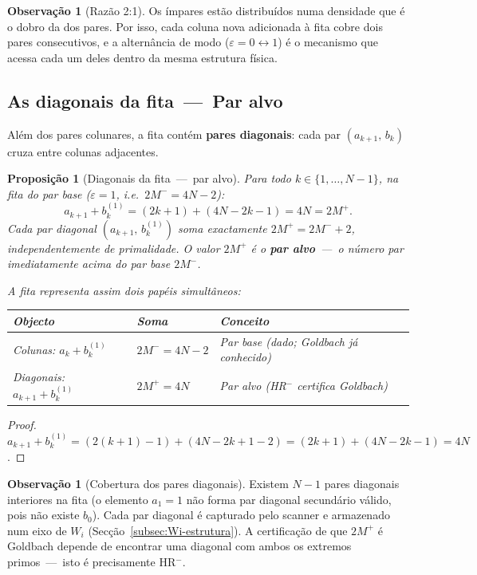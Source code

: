 \documentclass[12pt, a4paper]{article}
\theoremstyle{plain}
\newtheorem{proposition}[theorem]{Proposição}
\theoremstyle{definition}
\newtheorem{remark}[theorem]{Observação}
\theoremstyle{remark}
\begin{document}
	\begin{remark}[Razão 2:1]
		Os ímpares estão distribuídos numa densidade que é o dobro da dos
		pares.  Por isso, cada coluna nova adicionada à fita cobre dois
		pares consecutivos, e a alternância de modo
		($\varepsilon=0\leftrightarrow1$) é o mecanismo que acessa cada
		um deles dentro da mesma estrutura física.
	\end{remark}
	
	\subsection{As diagonais da fita~---~Par alvo}
	\label{subsec:diagonais}
	
	Além dos pares colunares, a fita contém \textbf{pares diagonais}: cada
	par $(a_{k+1},\,b_k)$ cruza entre colunas adjacentes.
	
	\begin{proposition}[Diagonais da fita~---~par alvo]
		\label{prop:diagonal-alvo}
		Para todo $k\in\{1,\ldots,N-1\}$, na fita do par base
		($\varepsilon=1$, i.e.\ $2M^-=4N-2$):
		\[
		a_{k+1}+b_k^{(1)}
		=(2k+1)+(4N-2k-1)
		=4N=2M^+.
		\]
		Cada par diagonal $(a_{k+1},\,b_k^{(1)})$ soma exactamente
		$2M^+=2M^-+2$, independentemente de primalidade.
		O valor $2M^+$ é o \textbf{par alvo}~---~o número par
		imediatamente acima do par base $2M^-$.
		
		\medskip
		A fita representa assim dois papéis simultâneos:
		\begin{center}
			\begin{tabular}{lll}
				\toprule
				Objecto & Soma & Conceito\\
				\midrule
				Colunas: $a_k+b_k^{(1)}$ &
				$2M^-=4N-2$ & Par base (dado; Goldbach já conhecido)\\
				Diagonais: $a_{k+1}+b_k^{(1)}$ &
				$2M^+=4N$   & Par alvo (HR$^-$ certifica Goldbach)\\
				\bottomrule
			\end{tabular}
		\end{center}
	\end{proposition}
	
	\begin{proof}
		$a_{k+1}+b_k^{(1)}=(2(k+1)-1)+(4N-2k+1-2)=(2k+1)+(4N-2k-1)=4N$.
	\end{proof}
	
	\begin{remark}[Cobertura dos pares diagonais]
		Existem $N-1$ pares diagonais interiores na fita (o elemento $a_1=1$
		não forma par diagonal secundário válido, pois não existe $b_0$).
		Cada par diagonal é capturado pelo scanner e armazenado num eixo de
		$W_i$ (Secção~\ref{subsec:Wi-estrutura}).  A certificação de que
		$2M^+$ é Goldbach depende de encontrar uma diagonal com ambos os
		extremos primos~---~isto é precisamente HR$^-$.
	\end{remark}
	
\end{document}
